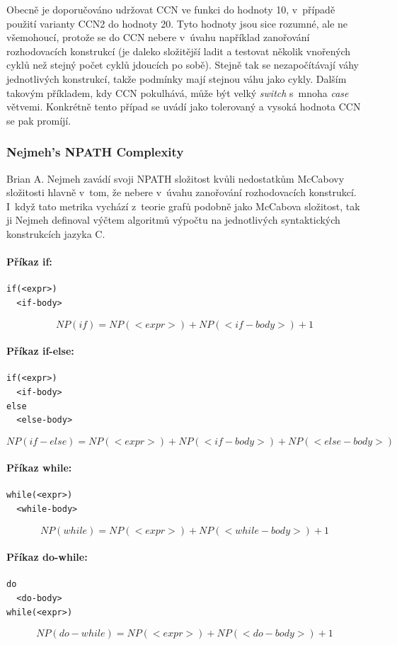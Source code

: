 \documentclass[11pt,twoside,a4paper]{book}
\begin{document}
Obecně je doporučováno udržovat CCN ve funkci do hodnoty 10, v~případě použití \mbox{varianty} CCN2 do hodnoty 20. Tyto hodnoty jsou sice rozumné,
ale ne všemohoucí, protože se do CCN nebere v~úvahu například zanořování rozhodovacích konstrukcí (je daleko složitější ladit a testovat
několik vnořených cyklů než stejný počet cyklů jdoucích po sobě). Stejně tak se nezapočítávají váhy jednotlivých konstrukcí,
takže podmínky mají stejnou váhu jako cykly. Dalším takovým příkladem, kdy CCN pokulhává, může být velký \textit{switch} s~mnoha \textit{case} větvemi.
Konkrétně tento případ se uvádí jako tolerovaný a vysoká hodnota CCN se pak promíjí.

\subsubsection{Nejmeh's NPATH Complexity}
\label{sec:NPATH}
Brian A. Nejmeh zavádí svoji NPATH složitost kvůli nedostatkům McCabovy složitosti hlavně v~tom, že nebere
v~úvahu zanořování rozhodovacích konstrukcí. I~když tato metrika vychází z~teorie grafů podobně jako McCabova
složitost, tak ji Nejmeh definoval \cite{NPATH} výčtem algoritmů výpočtu na jednotlivých syntaktických konstrukcích jazyka C.

\paragraph{Příkaz if:}
\begin{verbatim}
if(<expr>)
  <if-body>
\end{verbatim}
$$NP(if) = NP(<expr>) + NP(<if-body>) + 1$$

\paragraph{Příkaz if-else:}
\begin{verbatim}
if(<expr>)
  <if-body>
else
  <else-body>
\end{verbatim}
$$NP(if-else) = NP(<expr>) + NP(<if-body>) + NP(<else-body>)$$

\paragraph{Příkaz while:}
\begin{verbatim}
while(<expr>)
  <while-body>
\end{verbatim}
$$NP(while) = NP(<expr>) + NP(<while-body>) + 1$$

\paragraph{Příkaz do-while:}
\begin{verbatim}
do
  <do-body>
while(<expr>)
\end{verbatim}
$$NP(do-while) = NP(<expr>) + NP(<do-body>) + 1$$
\end{document}
